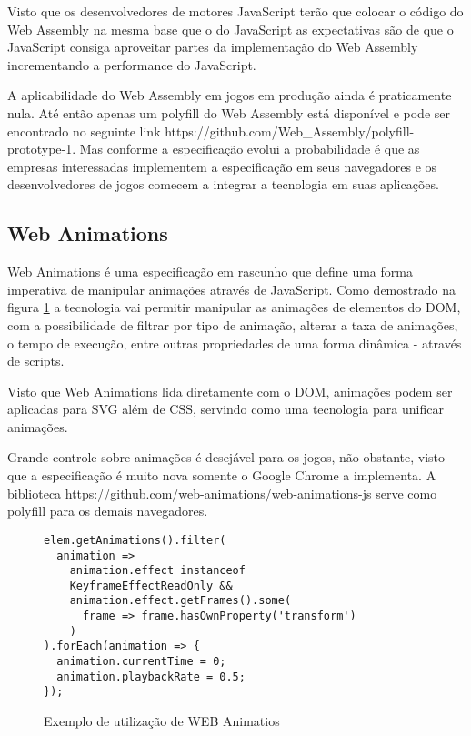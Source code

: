Visto que os desenvolvedores de motores JavaScript terão que colocar
o código do Web Assembly na mesma base que o do JavaScript as
expectativas são de que o JavaScript consiga aproveitar partes
da implementação do Web Assembly incrementando a performance do
JavaScript.

A aplicabilidade do Web Assembly em jogos em produção ainda
é praticamente nula. Até então apenas um polyfill do Web
Assembly está disponível e pode ser encontrado no seguinte link
https://github.com/Web\_Assembly/polyfill-prototype-1. Mas conforme a
especificação evolui a probabilidade é que as empresas interessadas
implementem a especificação em seus navegadores e os desenvolvedores
de jogos comecem a integrar a tecnologia em suas aplicações.

\subsection{Web Animations}

Web Animations é uma especificação em rascunho que define uma forma
imperativa de manipular animações através de JavaScript. Como
demostrado na figura \ref{fig:webAnimations} a tecnologia vai permitir
manipular as animações de elementos do DOM, com a possibilidade de 
filtrar por tipo de animação, alterar a taxa de
animações, o tempo de execução, entre outras propriedades de uma
forma dinâmica - através de scripts.

Visto que Web Animations lida diretamente com o DOM, animações podem
ser aplicadas para SVG além de CSS, servindo como uma tecnologia para
unificar animações.

Grande controle sobre animações é desejável para os jogos, não obstante,
visto que a especificação é muito nova somente o Google Chrome a implementa.
A biblioteca https://github.com/web-animations/web-animations-js serve
como polyfill para os demais navegadores.

\begin{figure}
    \centering
    \begin{verbatim}
elem.getAnimations().filter(
  animation =>
    animation.effect instanceof 
    KeyframeEffectReadOnly &&
    animation.effect.getFrames().some(
      frame => frame.hasOwnProperty('transform')
    )
).forEach(animation => {
  animation.currentTime = 0;
  animation.playbackRate = 0.5;
});
    \end{verbatim}
	\caption{Exemplo de utilização de WEB Animatios}
    \label{fig:webAnimations}
\end{figure}

